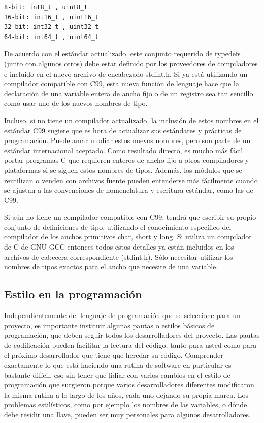 \documentclass[output=paper, 
colorlinks,
citecolor=brown,
newtxmath
]{langscibook}
\begin{document}
\begin{small}
\begin{verbatim}
8-bit: int8_t , uint8_t
16-bit: int16_t , uint16_t
32-bit: int32_t , uint32_t
64-bit: int64_t , uint64_t
\end{verbatim}
\end{small}




De acuerdo con el estándar actualizado, este conjunto requerido de 
typedefs (junto con algunos otros) debe estar definido por los 
proveedores de compiladores e incluido en el nuevo archivo 
de encabezado stdint.h. Si ya está utilizando un compilador 
compatible con C99, esta nueva función de lenguaje hace 
que la declaración de una variable entera de ancho fijo o de un registro 
sea tan sencillo como usar uno de los nuevos nombres de tipo.

Incluso, si no tiene un compilador actualizado, 
la inclusión de estos nombres en el estándar C99 sugiere 
que es hora de actualizar sus estándares y prácticas de programación. 
Puede amar u odiar estos nuevos nombres, pero son parte de un estándar 
internacional aceptado. Como resultado directo, es mucho más fácil 
portar programas C que requieren enteros de ancho fijo a otros compiladores 
y plataformas si se siguen estos nombres de tipos.
Además, los módulos que se reutilizan o venden con archivos fuente 
pueden entenderse más fácilmente cuando se ajustan 
a las convenciones de nomenclatura y escritura estándar, como las de C99.

Si aún no tiene un compilador compatible con C99, 
tendrá que escribir su propio conjunto de definiciones de tipo, 
utilizando el conocimiento específico del compilador 
de los anchos primitivos char, short y long. 
Si utiliza un compilador de C de GNU GCC entonces todos estos
detalles ya están incluidos en los archivos de cabecera correspondiente (stdint.h).
Sólo necesitar utilizar los nombres de tipos exactos para el ancho que
necesite de una variable.


\subsection {Estilo en la programación}

Independientemente del lenguaje de programación que se seleccione 
para un proyecto, es importante instituir algunas pautas 
o estilos básicos de programación, que deben seguir todos 
los desarrolladores del proyecto. 
Las pautas de codificación pueden facilitar la lectura del código, 
tanto para usted como para el próximo desarrollador que 
tiene que heredar su código. Comprender exactamente lo que está 
haciendo una rutina de software en particular es bastante difícil,
eso sin tener que lidiar con varios cambios en el estilo de programación
que surgieron porque varios desarrolladores diferentes modificaron
la misma rutina a lo largo de los años, cada uno dejando su propia marca. 
Los problemas estilísticos, como por ejemplo los nombres de las
variables, o dónde debe residir una llave, pueden ser 
muy personales para algunos desarrolladores.
\end{document}
